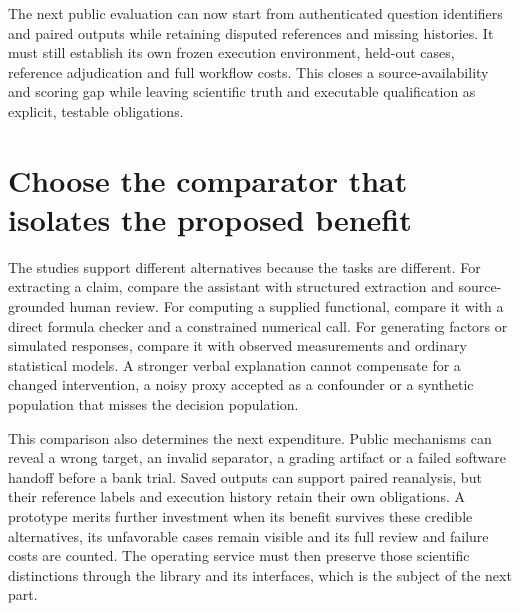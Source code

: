 The next public evaluation can now start from authenticated question identifiers
and paired outputs while retaining disputed references and missing histories.
It must still establish its own frozen execution environment, held-out cases,
reference adjudication and full workflow costs. This closes a source-availability
and scoring gap while leaving scientific truth and executable qualification as
explicit, testable obligations.

\section{Choose the comparator that isolates the proposed benefit}

The studies support different alternatives because the tasks are different. For extracting a claim, compare the assistant with structured extraction and source-grounded human review. For computing a supplied functional, compare it with a direct formula checker and a constrained numerical call. For generating factors or simulated responses, compare it with observed measurements and ordinary statistical models. A stronger verbal explanation cannot compensate for a changed intervention, a noisy proxy accepted as a confounder or a synthetic population that misses the decision population.

This comparison also determines the next expenditure. Public mechanisms can reveal a wrong target, an invalid separator, a grading artifact or a failed software handoff before a bank trial. Saved outputs can support paired reanalysis, but their reference labels and execution history retain their own obligations. A prototype merits further investment when its benefit survives these credible alternatives, its unfavorable cases remain visible and its full review and failure costs are counted. The operating service must then preserve those scientific distinctions through the library and its interfaces, which is the subject of the next part.
